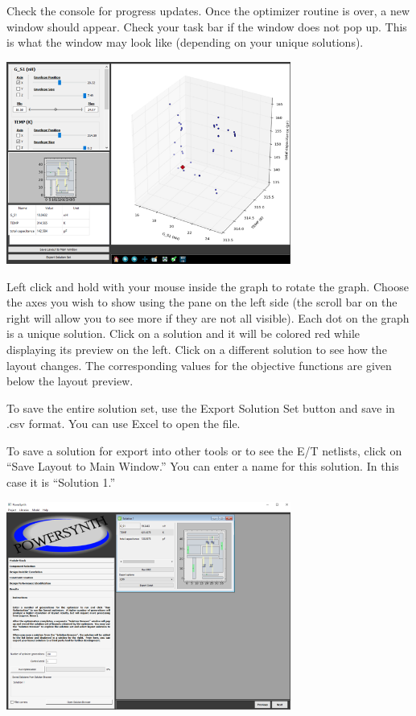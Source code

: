 \documentclass[11pt]{article}
\begin{document}
Check the console for progress updates. Once the optimizer routine is over, a new window should appear. Check your task bar if the window does not pop up. This is what the window may look like (depending on your unique solutions). 

\begin{center}
\includegraphics[width=0.7\textwidth]{./figs/27_SolutionBrowser.png}
\end{center}

Left click and hold with your mouse inside the graph to rotate the graph. Choose the axes you wish to show using the pane on the left side (the scroll bar on the right will allow you to see more if they are not all visible). Each dot on the graph is a unique solution. Click on a solution and it will be colored red while displaying its preview on the left. Click on a different solution to see how the layout changes. The corresponding values for the objective functions are given below the layout preview. 

To save the entire solution set, use the Export Solution Set button and save in .csv format. You can use Excel to open the file. 

To save a solution for export into other tools or to see the E/T netlists, click on “Save Layout to Main Window.” You can enter a name for this solution. In this case it is “Solution 1.”

\begin{center}
\includegraphics[width=0.7\textwidth]{./figs/28_SolnBrowser.png}
\end{center}
\end{document}
